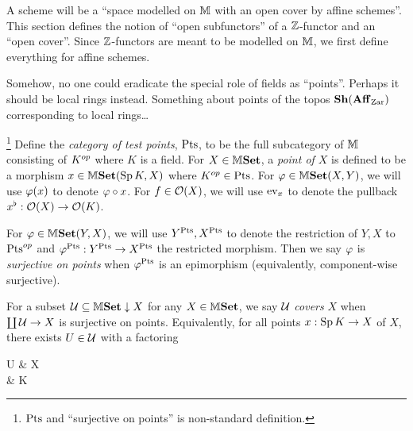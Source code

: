 \documentclass[../main.tex]{subfiles}
\begin{document}
\begin{rmk}
  A scheme will be a 
  ``space modelled on $\mathbb{M}$ with an open cover by affine schemes''.
  This section defines the notion of ``open subfunctors'' 
  of a $\mathbb{Z}$-functor and an ``open cover''.
  Since $\mathbb{Z}$-functors are meant to be 
  modelled on $\mathbb{M}$,
  we first define everything for affine schemes.

  Somehow, no one could eradicate the 
  special role of fields as ``points''. 
  Perhaps it should be local rings instead.
  Something about points of the topos $\mathbf{Sh}(\mathbf{Aff}_{\mathrm{Zar}})$
  corresponding to local rings\dots
\end{rmk}

\begin{dfn}\footnote{
  $\mathrm{Pts}$ and ``surjective on points'' is non-standard definition.
  }
  Define the \emph{category of test points}, $\mathrm{Pts}$, 
  to be the full subcategory of $\mathbb{M}$ consisting of $K^{op}$ where $K$ is a field.
  For $X \in \mathbb{M}\mathbf{Set}$, 
  a \emph{point of $X$} is defined to be 
  a morphism $x \in \mathbb{M}\mathbf{Set}(\operatorname{Sp} K,X)$ where $K^{op} \in \mathrm{Pts}$.
  For $\varphi \in \mathbb{M}\mathbf{Set}(X,Y)$,
  we will use $\varphi(x)$ to denote $\varphi \circ x$.
  For $f \in \mathcal{O}(X)$, 
  we will use $\operatorname{ev}_x$ to denote the pullback $x^\flat : \mathcal{O}(X) \to \mathcal{O}(K)$.

  For $\varphi \in \mathbb{M}\mathbf{Set}(Y,X)$,
  we will use $Y^{\mathrm{Pts}},X^{\mathrm{Pts}}$ to denote the restriction of $Y,X$ to $\mathrm{Pts}^{op}$
  and $\varphi^{\mathrm{Pts}} : Y^{\mathrm{Pts}} \to X^{\mathrm{Pts}}$ the restricted morphism.
  Then we say $\varphi$ is \emph{surjective on points} when 
  $\varphi^{\mathrm{Pts}}$ is an epimorphism (equivalently, component-wise surjective).
  
  For a subset $\mathcal{U} \subseteq \mathbb{M}\mathbf{Set}\downarrow X$ for any $X \in \mathbb{M}\mathbf{Set}$,
  we say $\mathcal{U}$ \emph{covers} $X$ when 
  $\coprod \mathcal{U} \to X$ is surjective on points.
  Equivalently, for all points $x : \operatorname{Sp} K \to X$ of $X$, 
  there exists $U \in \mathcal{U}$ with a factoring 
  \begin{cd}
    U \ar[r] & X \\
    & \SP K \ar[u,"x"{swap}] \ar[ul]
  \end{cd}
\end{dfn}
\end{document}
